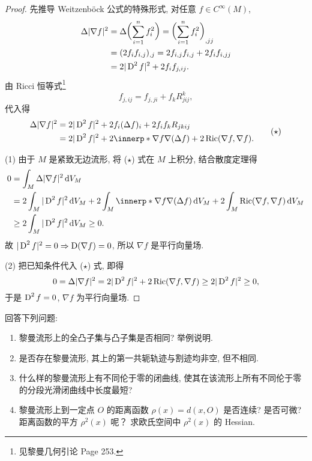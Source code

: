 \begin{proof}
  先推导 Weitzenb\"ock 公式的特殊形式, 对任意 $f\in C^{\infty}(M)$,
  \begin{align*}
    \Delta|\nabla f|^2
    & = \Delta\biggl(\sum_{i=1}^n f_i^2\biggr) = \biggl(\sum_{i=1}^n f_i^2\biggr)_{,jj} \\
    & = (2f_if_{i,j})_{,j} = 2f_{i,j}f_{i,j}+2f_if_{i,jj} \\
    & = 2|\operatorname{D}^2f|^2 + 2f_if_{j,ij}.
  \end{align*}
  由 Ricci 恒等式\footnote{见黎曼几何引论 Page 253.}
  \[f_{j,ij} = f_{j,ji} + f_kR_{jij}^k,\]
  代入得
  \begin{equation}
    \begin{aligned}
      \Delta|\nabla f|^2
      & = 2|\D^2f|^2 + 2f_i(\Delta f)_i + 2f_if_kR_{jkij} \\
      & = 2|\D^2f|^2 + 2\innerp*{\nabla f}{\nabla(\Delta f)} + 2\Ric(\nabla f,\nabla f).
    \end{aligned}\tag{$\star$}
  \end{equation}

  (1) 由于 $M$ 是紧致无边流形, 将 ($\star$) 式在 $M$ 上积分, 结合散度定理得
  \begin{align*}
    0
    & = \int_M \Delta|\nabla f|^2\diff V_M \\
    & = 2\int_M |\D^2f|^2\diff V_M +2\int_M \innerp*{\nabla f}{\nabla(\Delta f)}\diff V_M
      + 2\int_M \Ric(\nabla f,\nabla f)\diff V_M \\
    & \geq 2\int_M |\D^2f|^2\diff V_M\geq 0.
  \end{align*}
  故 $|\operatorname{D}^2f|^2=0\Rightarrow \operatorname{D}(\nabla f)=0$, 所以 $\nabla f$ 是平行向量场.

  (2) 把已知条件代入 ($\star$) 式, 即得
  \[0 = \Delta|\nabla f|^2 = 2|\operatorname{D}^2f|^2+2\operatorname{Ric}(\nabla f,\nabla f)\geq 2|\operatorname{D}^2f|^2\geq 0,\]
  于是 $\operatorname{D}^2f=0$, $\nabla f$ 为平行向量场.
\end{proof}



\begin{exercise}
  回答下列问题:
  \begin{enumerate}[(1)]
    \item 黎曼流形上的全凸子集与凸子集是否相同? 举例说明.
    \item 是否存在黎曼流形, 其上的第一共轭轨迹与割迹均非空, 但不相同.
    \item 什么样的黎曼流形上有不同伦于零的闭曲线, 使其在该流形上所有不同伦于零的分段光滑闭曲线中长度最短?
    \item 黎曼流形上到一定点 $O$ 的距离函数 $\rho(x)=d(x,O)$ 是否连续? 是否可微? 距离函数的平方 $\rho^2(x)$ 呢？
      求欧氏空间中 $\rho^2(x)$ 的 Hessian.
  \end{enumerate}
\end{exercise}

